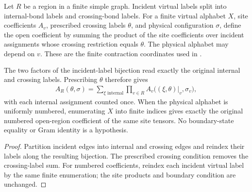 \begin{definition}%
    \label{def:peps_graph_open_region_contraction}
    \leanok
    Let $R$ be a region in a finite simple graph. Incident virtual labels
    split into internal-bond labels and crossing-bond labels. For a finite
    virtual alphabet $X$, site coefficients $A_v$, prescribed crossing
    labels $\theta$, and physical configuration $\sigma$, define the
    open coefficient by summing the product of the site coefficients over
    incident assignments whose crossing restriction equals $\theta$.
    The physical alphabet may depend on $v$.
    These are the finite contraction coordinates used in
    \cite[Sections~6.2--6.3 and~7]{Schuch2010PEPS}.
\end{definition}

\begin{lemma}%
    \label{thm:peps_graph_open_region_contraction}
    \leanok
    The two factors of the incident-label bijection read exactly the original
    internal and crossing labels. Prescribing $\theta$ therefore gives
    \begin{align}
        A_R(\theta,\sigma)
        =\sum_{\xi\text{ internal}}\prod_{v\in R}
        A_v\bigl((\xi,\theta)|_v,\sigma_v\bigr),
    \end{align}
    with each internal assignment counted once. When the physical alphabet
    is uniformly numbered, enumerating $X$ into finite indices gives exactly
    the original numbered open-region coefficient of the same site tensors.
    No boundary-state equality or Gram identity is a hypothesis.
\end{lemma}

\begin{proof}\leanok
    Partition incident edges into internal and crossing edges and reindex
    their labels along the resulting bijection. The prescribed crossing
    condition removes the crossing-label sum. For numbered coefficients,
    reindex each incident virtual label by the same finite enumeration;
    the site products and boundary condition are unchanged.
\end{proof}
